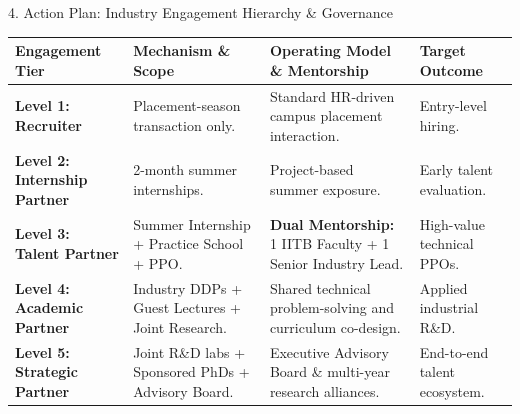 \documentclass[aspectratio=169, 10pt]{beamer}
\begin{document}
\begin{frame}{4. Action Plan: Industry Engagement Hierarchy \& Governance}
  \scriptsize
  \renewcommand{\arraystretch}{1.25}
  \centering
  \begin{tabular}{L{2.8cm} L{4.0cm} L{4.2cm} L{3.0cm}}
    \toprule
    \textbf{Engagement Tier} & \textbf{Mechanism \& Scope} & \textbf{Operating Model \& Mentorship} & \textbf{Target Outcome} \\
    \midrule
    \textbf{Level 1: Recruiter} & Placement-season transaction only. & Standard HR-driven campus placement interaction. & Entry-level hiring. \\
    \addlinespace[2pt]
    \textbf{Level 2: Internship Partner} & 2-month summer internships. & Project-based summer exposure. & Early talent evaluation. \\
    \addlinespace[2pt]
    \textbf{Level 3: Talent Partner} & Summer Internship + Practice School + PPO. & \textbf{Dual Mentorship:} 1 IITB Faculty + 1 Senior Industry Lead. & High-value technical PPOs. \\
    \addlinespace[2pt]
    \textbf{Level 4: Academic Partner} & Industry DDPs + Guest Lectures + Joint Research. & Shared technical problem-solving and curriculum co-design. & Applied industrial R\&D. \\
    \addlinespace[2pt]
    \textbf{Level 5: Strategic Partner} & Joint R\&D labs + Sponsored PhDs + Advisory Board. & Executive Advisory Board \& multi-year research alliances. & End-to-end talent ecosystem. \\
    \bottomrule
  \end{tabular}
\end{frame}
\end{document}
